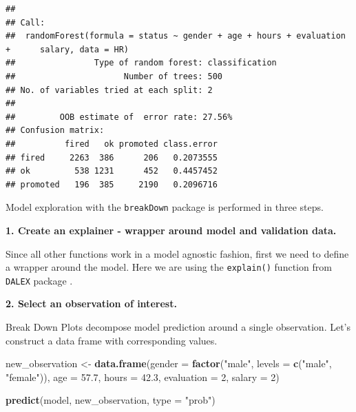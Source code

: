 \documentclass[]{book}
\newenvironment{Shaded}{\begin{snugshade}}{\end{snugshade}}
\newcommand{\ControlFlowTok}[1]{\textcolor[rgb]{0.13,0.29,0.53}{\textbf{#1}}}
\newcommand{\DataTypeTok}[1]{\textcolor[rgb]{0.13,0.29,0.53}{#1}}
\newcommand{\DecValTok}[1]{\textcolor[rgb]{0.00,0.00,0.81}{#1}}
\newcommand{\FloatTok}[1]{\textcolor[rgb]{0.00,0.00,0.81}{#1}}
\newcommand{\KeywordTok}[1]{\textcolor[rgb]{0.13,0.29,0.53}{\textbf{#1}}}
\newcommand{\NormalTok}[1]{#1}
\newcommand{\OperatorTok}[1]{\textcolor[rgb]{0.81,0.36,0.00}{\textbf{#1}}}
\newcommand{\StringTok}[1]{\textcolor[rgb]{0.31,0.60,0.02}{#1}}
\theoremstyle{definition}
\theoremstyle{definition}
\theoremstyle{definition}
\theoremstyle{remark}
\begin{document}
\begin{verbatim}
## 
## Call:
##  randomForest(formula = status ~ gender + age + hours + evaluation +      salary, data = HR) 
##                Type of random forest: classification
##                      Number of trees: 500
## No. of variables tried at each split: 2
## 
##         OOB estimate of  error rate: 27.56%
## Confusion matrix:
##          fired   ok promoted class.error
## fired     2263  386      206   0.2073555
## ok         538 1231      452   0.4457452
## promoted   196  385     2190   0.2096716
\end{verbatim}

Model exploration with the \texttt{breakDown} package is performed in
three steps.

\textbf{1. Create an explainer - wrapper around model and validation
data.}

Since all other functions work in a model agnostic fashion, first we
need to define a wrapper around the model. Here we are using the
\texttt{explain()} function from \texttt{DALEX} package \citep{R-DALEX}.

\begin{Shaded}
\end{Shaded}

\textbf{2. Select an observation of interest.}

Break Down Plots decompose model prediction around a single observation.
Let's construct a data frame with corresponding values.

\begin{Shaded}
\begin{Highlighting}[]
\NormalTok{new_observation <-}\StringTok{ }\KeywordTok{data.frame}\NormalTok{(}\DataTypeTok{gender =} \KeywordTok{factor}\NormalTok{(}\StringTok{"male"}\NormalTok{, }\DataTypeTok{levels =} \KeywordTok{c}\NormalTok{(}\StringTok{"male"}\NormalTok{, }\StringTok{"female"}\NormalTok{)),}
                      \DataTypeTok{age =} \FloatTok{57.7}\NormalTok{,}
                      \DataTypeTok{hours =} \FloatTok{42.3}\NormalTok{,}
                      \DataTypeTok{evaluation =} \DecValTok{2}\NormalTok{,}
                      \DataTypeTok{salary =} \DecValTok{2}\NormalTok{)}

\KeywordTok{predict}\NormalTok{(model, new_observation, }\DataTypeTok{type =} \StringTok{"prob"}\NormalTok{)}
\end{Highlighting}
\end{Shaded}
\end{document}

